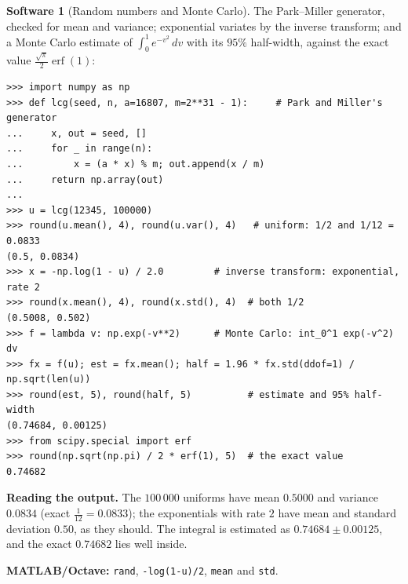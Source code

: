 \documentclass[11pt,a4paper]{article}
\numberwithin{equation}{section}
\theoremstyle{definition}
\newtheorem{software}[thm]{Software}
\begin{document}
\begin{software}[Random numbers and Monte Carlo]
\label{sw:random}
The Park--Miller generator, checked for mean and variance; exponential variates by the inverse transform; and a Monte Carlo estimate of $\int_0^1e^{-v^2}\,dv$ with its $95\%$ half-width, against the exact value $\frac{\sqrt\pi}2\operatorname{erf}(1)$:
{\small\begin{verbatim}
>>> import numpy as np
>>> def lcg(seed, n, a=16807, m=2**31 - 1):     # Park and Miller's generator
...     x, out = seed, []
...     for _ in range(n):
...         x = (a * x) % m; out.append(x / m)
...     return np.array(out)
...
>>> u = lcg(12345, 100000)
>>> round(u.mean(), 4), round(u.var(), 4)   # uniform: 1/2 and 1/12 = 0.0833
(0.5, 0.0834)
>>> x = -np.log(1 - u) / 2.0         # inverse transform: exponential, rate 2
>>> round(x.mean(), 4), round(x.std(), 4)  # both 1/2
(0.5008, 0.502)
>>> f = lambda v: np.exp(-v**2)      # Monte Carlo: int_0^1 exp(-v^2) dv
>>> fx = f(u); est = fx.mean(); half = 1.96 * fx.std(ddof=1) / np.sqrt(len(u))
>>> round(est, 5), round(half, 5)          # estimate and 95% half-width
(0.74684, 0.00125)
>>> from scipy.special import erf
>>> round(np.sqrt(np.pi) / 2 * erf(1), 5)  # the exact value
0.74682
\end{verbatim}}
\textbf{Reading the output.} The $100\,000$ uniforms have mean $0.5000$ and variance $0.0834$ (exact $\frac1{12} = 0.0833$); the exponentials with rate $2$ have mean and standard deviation $0.50$, as they should. The integral is estimated as $0.74684 \pm 0.00125$, and the exact $0.74682$ lies well inside.

\textbf{MATLAB/Octave:} \texttt{rand}, \texttt{-log(1-u)/2}, \texttt{mean} and \texttt{std}.
\end{software}
\end{document}
